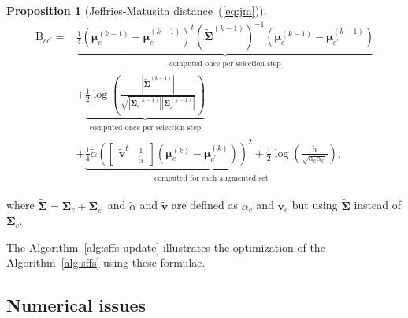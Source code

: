 \documentclass[journal,peerreview,onecolumn]{IEEEtran}
\newtheorem{prop}{Proposition}
\begin{document}
      \begin{prop}[Jeffries-Matusita distance~(\ref{eq:jm})]
      \begin{align}
        \label{eq:jm-update}
            \text{B}_{cc^\prime} = &\underbrace{\frac{1}{4} (\boldsymbol{\mu}_c^{(k-1)} - \boldsymbol{\mu}_{c^\prime}^{(k-1)})^t ( \boldsymbol{\tilde{\Sigma}}^{(k-1)} )^{-1} (\boldsymbol{\mu}_c^{(k-1)} - \boldsymbol{\mu}_{c^\prime}^{(k-1)})}_{\substack{\text{computed once per selection step}}} \nonumber \\
            &+ \underbrace{\frac{1}{2} \log \left( \frac{|\boldsymbol{\tilde{\Sigma}}^{(k-1)}|}{\sqrt{|\boldsymbol{\Sigma}_c^{(k-1)}| |\boldsymbol{\Sigma}_{c^\prime}^{(k-1)}|}} \right)}_{\substack{\text{computed once per selection step}}} \nonumber \\
            &+ \underbrace{\frac{1}{4} \tilde{\alpha} ( \left[\begin{array}{cc} \mathbf{\tilde{v}}^t & \frac{1}{\tilde{\alpha}} \end{array}\right] (\boldsymbol{\mu}_c^{(k)} - \boldsymbol{\mu}_{c^\prime}^{(k)}) )^2 + \frac{1}{2} \log \left( \frac{\tilde{\alpha}}{\sqrt{\alpha_c \alpha_{c^\prime}}} \right)}_{\substack{\text{computed for each augmented set}}},
      \end{align}
    \end{prop}
    \noindent where $\boldsymbol{\tilde{\Sigma}} = \boldsymbol{\Sigma}_c + \boldsymbol{\Sigma}_{c^\prime}$ and $\tilde{\alpha}$ and $\mathbf{\tilde{v}}$ are defined as $\alpha_c$ and $\mathbf{v}_c$ but using $\boldsymbol{\tilde{\Sigma}}$ instead of $\boldsymbol{\Sigma}_c$.
    
    The  Algorithm~\ref{alg:sffs-update} illustrates  the optimization
    of the Algorithm~\ref{alg:sffs} using these formulae.

    \subsection{Numerical issues}
\end{document}
